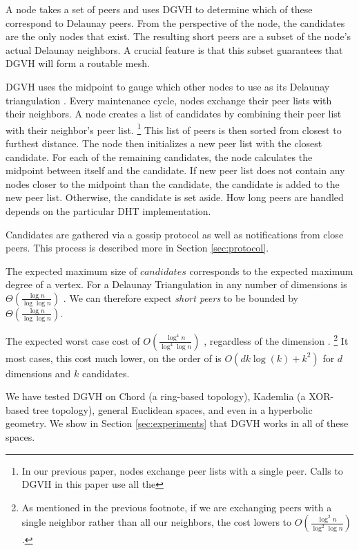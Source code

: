 \documentclass[11pt,conference]{IEEEtran}
\begin{document}
A node takes a set of peers and uses DGVH to determine which of these correspond to Delaunay peers.
From the perspective of the node, the candidates are the only nodes that exist.
The resulting short peers are a subset of the node's actual Delaunay neighbors.
A crucial feature is that this subset guarantees that DGVH will form a routable mesh.


DGVH uses the midpoint to gauge which other nodes to use as its Delaunay triangulation \cite{dgvh}.
Every maintenance cycle, nodes exchange their peer lists with their neighbors.
A node creates a list of candidates by combining their peer list with their neighbor's peer list. \footnote{In our previous paper, nodes exchange peer lists with a single peer. Calls to DGVH in this paper use all the }
This list of peers is then sorted from closest to furthest distance.
The node then initializes a new peer list with the closest candidate.
For each of the remaining candidates, the node calculates the midpoint between itself and the candidate.
If new peer list does not contain any nodes closer to the midpoint than the candidate, the candidate is added to the new peer list.
Otherwise, the candidate is set aside.
How long peers are handled depends on the particular DHT implementation.


Candidates are gathered via a gossip protocol as well as notifications from close peers.
This process is described more in Section \ref{sec:protocol}.

The expected maximum size of $ candidates $ corresponds to the expected maximum degree of a vertex.
For a Delaunay Triangulation in any number of dimensions is $\Theta(\frac{\log n}{\log \log n} )$ \cite{bern1991expected}. 
We can therefore expect \textit{short peers} to be bounded by $\Theta(\frac{\log n}{\log \log n})$.

The expected worst case cost of \(O(\frac{\log^{4} n}{\log^{4} \log n} )\) \cite{dgvh}, regardless of the dimension \cite{dgvh}. \footnote{As mentioned in the previous footnote, if we are exchanging peers with a single neighbor rather than all our neighbors, the cost lowers to \(O(\frac{\log^{2} n}{\log^{2} \log n} )\).}
It most cases, this cost much lower, on the order of is $ O(dk\log(k) + k^{2} ) $ for $ d $ dimensions and $ k $ candidates.

We have tested DGVH on Chord (a ring-based topology), Kademlia (a XOR-based tree topology), general Euclidean spaces, and even in a hyperbolic geometry.
We show in Section \ref{sec:experiments} that DGVH works in all of these spaces.
\end{document}
